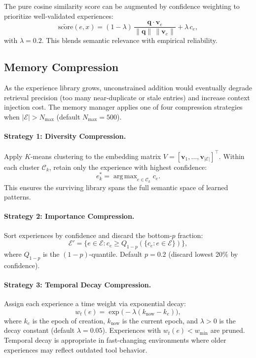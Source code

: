 \documentclass[11pt]{article}
\DeclareMathOperator*{\argmax}{arg\,max}
\begin{document}
The pure cosine similarity score can be augmented by confidence weighting to
prioritize well-validated experiences:
\begin{equation}
    \tilde{\text{score}}(e, x) = (1 - \lambda)\,\frac{\bm{q} \cdot \bm{v}_e}{\|\bm{q}\|\,\|\bm{v}_e\|}
    + \lambda\, c_e,
    \label{eq:conf-weighted-score}
\end{equation}
with $\lambda = 0.2$. This blends semantic relevance with empirical reliability.

\subsection{Memory Compression}
\label{sec:compression}

As the experience library grows, unconstrained addition would eventually
degrade retrieval precision (too many near-duplicate or stale entries) and
increase context injection cost. The memory manager applies one of four
compression strategies when $|\mathcal{E}| > N_{\max}$ (default $N_{\max} = 500$).

\paragraph{Strategy 1: Diversity Compression.}
Apply $K$-means clustering to the embedding matrix
$V = [\bm{v}_1, \ldots, \bm{v}_{|\mathcal{E}|}]^\top$. Within each cluster
$\mathcal{C}_k$, retain only the experience with highest confidence:
\begin{equation}
    e^*_k = \argmax_{e \in \mathcal{C}_k} c_e.
    \label{eq:diversity-compression}
\end{equation}
This ensures the surviving library spans the full semantic space of learned
patterns.

\paragraph{Strategy 2: Importance Compression.}
Sort experiences by confidence and discard the bottom-$p$ fraction:
\begin{equation}
    \mathcal{E}' = \bigl\{e \in \mathcal{E} : c_e \geq Q_{1-p}(\{c_e : e \in \mathcal{E}\})\bigr\},
    \label{eq:importance-compression}
\end{equation}
where $Q_{1-p}$ is the $(1-p)$-quantile. Default $p = 0.2$ (discard lowest
20\% by confidence).

\paragraph{Strategy 3: Temporal Decay Compression.}
Assign each experience a time weight via exponential decay:
\begin{equation}
    w_t(e) = \exp\bigl(-\lambda(k_{\text{now}} - k_e)\bigr),
    \label{eq:temporal-decay}
\end{equation}
where $k_e$ is the epoch of creation, $k_{\text{now}}$ is the current epoch,
and $\lambda > 0$ is the decay constant (default $\lambda = 0.05$). Experiences
with $w_t(e) < w_{\min}$ are pruned. Temporal decay is appropriate in
fast-changing environments where older experiences may reflect outdated tool
behavior.
\end{document}
